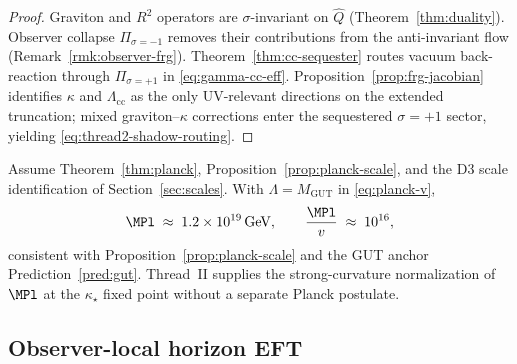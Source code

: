 \begin{proof}
Graviton and $R^2$ operators are $\sigma$-invariant on $\hat Q$
(Theorem~\ref{thm:duality}). Observer collapse $\Pi_{\sigma=-1}$ removes
their contributions from the anti-invariant flow
(Remark~\ref{rmk:observer-frg}). Theorem~\ref{thm:cc-sequester} routes vacuum
back-reaction through $\Pi_{\sigma=+1}$ in \eqref{eq:gamma-cc-eff}.
Proposition~\ref{prop:frg-jacobian} identifies $\kappa$ and
$\Lambda_{\mathrm{cc}}$ as the only UV-relevant directions on the extended
truncation; mixed graviton--$\kappa$ corrections enter the sequestered
$\sigma=+1$ sector, yielding \eqref{eq:thread2-shadow-routing}.
\end{proof}

\begin{corollary}
\label{cor:thread-2-planck}
Assume Theorem~\ref{thm:planck}, Proposition~\ref{prop:planck-scale}, and the
D3 scale identification of Section~\ref{sec:scales}. With
$\Lambda=M_{\mathrm{GUT}}$ in \eqref{eq:planck-v},
\begin{equation}\label{eq:thread2-planck-numeric}
  \MPl
  \;\approx\;
  1.2\times 10^{19}\,\mathrm{GeV},
  \qquad
  \frac{\MPl}{v}
  \;\approx\;
  10^{16},
\end{equation}
consistent with Proposition~\ref{prop:planck-scale} and the GUT anchor
Prediction~\ref{pred:gut}. Thread~II supplies the strong-curvature
normalization of $\MPl$ at the $\kappa_\star$ fixed point without a separate
Planck postulate.
\end{corollary}

\subsection{Observer-local horizon EFT}
\label{sec:wave5-thread2:horizon}

